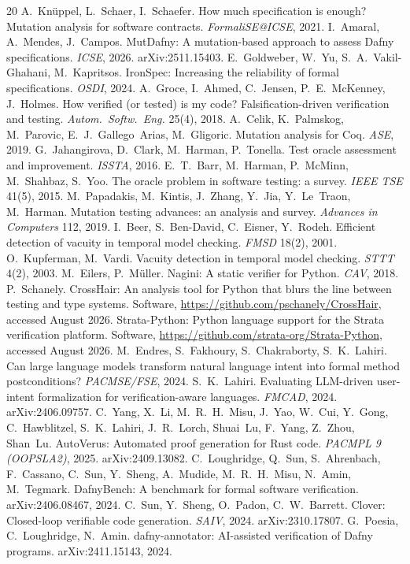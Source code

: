 \documentclass{article}
\begin{document}
\begin{thebibliography}{20}
\small
{} A.~Knüppel, L.~Schaer, I.~Schaefer.
How much specification is enough? Mutation analysis for software contracts.
\emph{FormaliSE@ICSE}, 2021.
 I.~Amaral, A.~Mendes, J.~Campos. MutDafny: A
mutation-based approach to assess Dafny specifications. \emph{ICSE}, 2026.
arXiv:2511.15403.
 E.~Goldweber, W.~Yu, S.~A.~Vakil-Ghahani,
M.~Kapritsos. IronSpec: Increasing the reliability of formal
specifications. \emph{OSDI}, 2024.
 A.~Groce, I.~Ahmed, C.~Jensen, P.~E.~McKenney, J.~Holmes.
How verified (or tested) is my code? Falsification-driven verification and
testing. \emph{Autom.\ Softw.\ Eng.} 25(4), 2018.
 A.~Celik, K.~Palmskog, M.~Parovic, E.~J.~Gallego~Arias,
M.~Gligoric. Mutation analysis for Coq. \emph{ASE}, 2019.
 G.~Jahangirova, D.~Clark, M.~Harman, P.~Tonella.
Test oracle assessment and improvement. \emph{ISSTA}, 2016.
 E.~T.~Barr, M.~Harman, P.~McMinn, M.~Shahbaz, S.~Yoo. The
oracle problem in software testing: a survey. \emph{IEEE TSE} 41(5), 2015.
 M.~Papadakis, M.~Kintis, J.~Zhang, Y.~Jia,
Y.~Le~Traon, M.~Harman. Mutation testing advances: an analysis and survey.
\emph{Advances in Computers} 112, 2019.
 I.~Beer, S.~Ben-David, C.~Eisner, Y.~Rodeh. Efficient
detection of vacuity in temporal model checking. \emph{FMSD} 18(2), 2001.
 O.~Kupferman, M.~Vardi. Vacuity detection in temporal
model checking. \emph{STTT} 4(2), 2003.
 M.~Eilers, P.~Müller. Nagini: A static verifier for
Python. \emph{CAV}, 2018.
 P.~Schanely. CrossHair: An analysis tool for Python
that blurs the line between testing and type systems. Software,
\url{https://github.com/pschanely/CrossHair}, accessed August 2026.
 Strata-Python: Python language support for the Strata
verification platform. Software,
\url{https://github.com/strata-org/Strata-Python}, accessed August 2026.
 M.~Endres, S.~Fakhoury, S.~Chakraborty,
S.~K.~Lahiri. Can large language models transform natural language intent
into formal method postconditions? \emph{PACMSE/FSE}, 2024.
 S.~K.~Lahiri. Evaluating LLM-driven user-intent
formalization for verification-aware languages. \emph{FMCAD}, 2024.
arXiv:2406.09757.
 C.~Yang, X.~Li, M.~R.~H.~Misu, J.~Yao, W.~Cui,
Y.~Gong, C.~Hawblitzel, S.~K.~Lahiri, J.~R.~Lorch, Shuai~Lu, F.~Yang,
Z.~Zhou, Shan~Lu. AutoVerus: Automated proof generation for Rust code.
\emph{PACMPL 9 (OOPSLA2)}, 2025. arXiv:2409.13082.
 C.~Loughridge, Q.~Sun, S.~Ahrenbach, F.~Cassano,
C.~Sun, Y.~Sheng, A.~Mudide, M.~R.~H.~Misu, N.~Amin, M.~Tegmark.
DafnyBench: A benchmark for formal software verification.
arXiv:2406.08467, 2024.
 C.~Sun, Y.~Sheng, O.~Padon, C.~W.~Barrett. Clover:
Closed-loop verifiable code generation. \emph{SAIV}, 2024.
arXiv:2310.17807.
 G.~Poesia, C.~Loughridge, N.~Amin.
dafny-annotator: AI-assisted verification of Dafny programs.
arXiv:2411.15143, 2024.
\end{thebibliography}

\newpage

\end{document}
